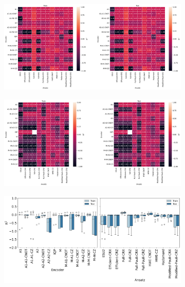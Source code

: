 \documentclass[journal=jacsat,manuscript=article]{achemso}
\begin{document}
\begin{figure}[H]
	\centering	
	\begin{subfigure}[b]{0.49\textwidth}
		\centering
		\includegraphics[width=\linewidth]{../images/BSE/fivequbit/BSE_heatplots}
		\caption{}
		\label{fig:5BSE_heatplots}
	\end{subfigure}
	\hfill
	\begin{subfigure}[b]{0.49\textwidth}
		\centering
		\includegraphics[width=\linewidth]{../images/BSE/sixteenqubit/BSE_heatplots}
		\caption{}
		\label{fig:16BSE_heatplots}
	\end{subfigure}
	\hfill
	\begin{subfigure}[b]{0.49\textwidth}
		\centering
		\includegraphics[width=\linewidth]{../images/BSE/fivequbit/BSE_boxplots}

\end{subfigure}
\end{figure}
\end{document}
